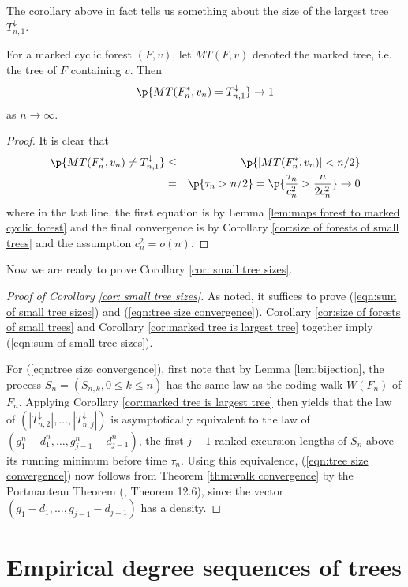 The corollary above in fact tells us something about the size of the largest tree $T^\downarrow_{n,1}$.
\begin{cor}\label{cor:marked tree is largest tree}
For a marked cyclic forest $(F,v)$, let $MT(F,v)$ denoted the marked tree, i.e. the tree of $F$ containing $v$. Then 
\[\p{MT(F_n^*,v_n)= T^\downarrow_{n,1}}\to 1\]
as $n\to\infty$.
\end{cor}
\begin{proof}
It is clear that
\begin{eqnarray*}
\p{MT(F_n^*,v_n)\ne T^\downarrow_{n,1}} &\le& \p{|MT(F_n^*,v_n)|<n/2}\\
&=& \p{\tau_n>n/2}=\p{\frac{\tau_n}{c^2_n}>\frac{n}{2c^2_n}}\to 0
\end{eqnarray*}
where in the last line, the first equation is by Lemma \ref{lem:maps forest to marked cyclic forest} and the final convergence is by Corollary \ref{cor:size of forests of small trees} and the assumption $c^2_n=o(n)$.
\end{proof}


Now we are ready to prove Corollary \ref{cor: small tree sizes}.
\begin{proof}[Proof of Corollary \ref{cor: small tree sizes}]
As noted, it suffices to prove (\ref{eqn:sum of small tree sizes}) and (\ref{eqn:tree size convergence}). Corollary \ref{cor:size of forests of small trees} and Corollary \ref{cor:marked tree is largest tree} together imply (\ref{eqn:sum of small tree sizes}). 

For (\ref{eqn:tree size convergence}), 
first note that by Lemma \ref{lem:bijection}, the process $S_n=(S_{n,k},0 \le k \le n)$ has the same law as the coding walk $W(F_n)$ of $F_n$. Applying Corollary \ref{cor:marked tree is largest tree} then yields that the law of $(|T_{n,2}^{\downarrow}|,\ldots,|T_{n,j}^{\downarrow}|)$ is asymptotically equivalent to the law of $(g^n_1-d^n_1,\ldots,g^n_{j-1}-d^n_{j-1})$, the first $j-1$ ranked excursion lengths of $S_n$ above its running minimum before time $\tau_n$. Using this equivalence, (\ref{eqn:tree size convergence}) now follows from Theorem \ref{thm:walk convergence} by the Portmanteau Theorem (\cite{MortersPeresbook}, Theorem 12.6), since the vector $(g_1-d_1,\ldots,g_{j-1}-d_{j-1})$ has a density.
\end{proof}

\section{\bf Empirical degree sequences of trees}\label{sec:verify degree conditions}


